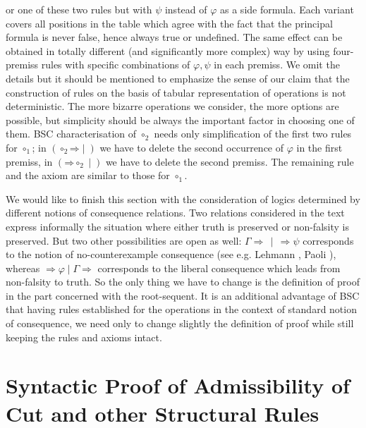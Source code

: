 \documentclass[10pt,a4paper]{article}
\theoremstyle{definition}
\newcommand{\3}{\vspace{.3in}}
\newcommand{\2}{\vspace{.2in}}
\newcommand{\1}{\vspace{.1in}}
\newcommand{\5}{\vspace{.05in}}
\begin{document}
or one of these two rules but with $\psi$ instead of $\varphi$ as a side formula. Each variant covers all positions in the table which agree with the fact that the principal formula is never false, hence always true or undefined. The same effect can be obtained in totally different (and significantly more complex) way by using four-premiss rules with specific combinations of $\varphi, \psi$ in each premiss. We omit the details but it should be mentioned to emphasize the sense of our claim that the construction of rules on the basis of tabular representation of operations is not deterministic. The more bizarre operations we consider, the more options are possible, but simplicity should be always the important factor in choosing one of them. BSC characterisation of $\circ_2$ needs only simplification of the first two rules for $\circ_1$; in $(\mathord{\circ_2}\mathord{\Rightarrow}\mid)$ we have to delete the second occurrence of $\varphi$ in the first premiss, in $(\mathord{\Rightarrow}\mathord{\circ_2}\mid)$ we have to delete the second premiss. The remaining rule and the axiom are similar to those for $\circ_1$.

\1

We would like to finish this section with the consideration of
logics determined by different notions of consequence relations. Two relations considered in the text express informally the situation where either truth is preserved or non-falsity is preserved. But two other possibilities are open as well: $\Gamma\Rightarrow\,\mid\, \Rightarrow\psi$ corresponds to the notion of no-counterexample consequence (see e.g. Lehmann \cite{Lehmann}, Paoli \cite{Paoli}), whereas $\Rightarrow \varphi \mid  \Gamma\Rightarrow$ corresponds to the liberal consequence which leads from non-falsity to truth. So the only thing we have to change is the definition of proof in the part concerned with the root-sequent. 
It is an additional advantage of BSC that having rules established for the operations in the context of standard notion of consequence, we need only to change slightly the definition of proof while still keeping the rules and axioms intact.

\section{Syntactic Proof of Admissibility of Cut and other Structural Rules}\label{Syntactic}
\end{document}

